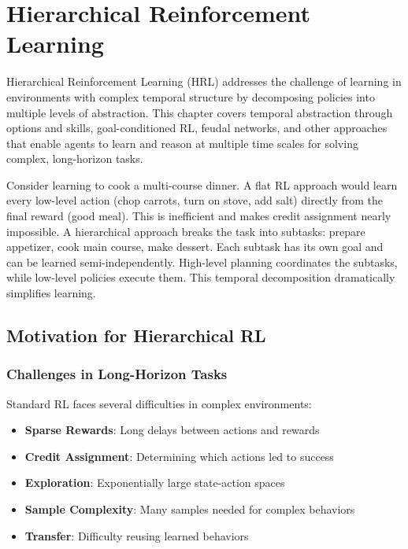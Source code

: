 \chapter{Hierarchical Reinforcement Learning}
\label{ch:hierarchical-rl}

\begin{keyideabox}
Hierarchical Reinforcement Learning (HRL) addresses the challenge of learning in environments with complex temporal structure by decomposing policies into multiple levels of abstraction. This chapter covers temporal abstraction through options and skills, goal-conditioned RL, feudal networks, and other approaches that enable agents to learn and reason at multiple time scales for solving complex, long-horizon tasks.
\end{keyideabox}

\begin{intuitionbox}
Consider learning to cook a multi-course dinner. A flat RL approach would learn every low-level action (chop carrots, turn on stove, add salt) directly from the final reward (good meal). This is inefficient and makes credit assignment nearly impossible. A hierarchical approach breaks the task into subtasks: prepare appetizer, cook main course, make dessert. Each subtask has its own goal and can be learned semi-independently. High-level planning coordinates the subtasks, while low-level policies execute them. This temporal decomposition dramatically simplifies learning.
\end{intuitionbox}

\section{Motivation for Hierarchical RL}

\subsection{Challenges in Long-Horizon Tasks}

Standard RL faces several difficulties in complex environments:

\begin{itemize}
    \item \textbf{Sparse Rewards}: Long delays between actions and rewards
    \item \textbf{Credit Assignment}: Determining which actions led to success
    \item \textbf{Exploration}: Exponentially large state-action spaces
    \item \textbf{Sample Complexity}: Many samples needed for complex behaviors
    \item \textbf{Transfer}: Difficulty reusing learned behaviors
\end{itemize}

